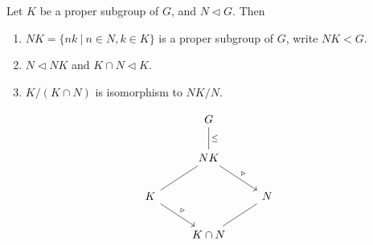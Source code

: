 \begin{theorem}
    Let $K$ be a proper subgroup of $G$, and $N \triangleleft G$. Then 
    \begin{enumerate}
        \item $NK = \{ nk \> | \> n\in N, k \in K \}$ is a proper subgroup of $G$, write $NK < G$.
        \item $N \triangleleft NK$ and $K \cap N \triangleleft K$.
        \item $K/(K \cap N)$ is isomorphism to $NK/N$.
    \end{enumerate}

    \[
        \begin{tikzcd}[row sep=2.0em]
            & G \arrow[dash, "\leq"]{d} & \\
            & NK \arrow[dash]{dl} \arrow[dr, "\triangleright"] & \\
            K \arrow[dr, "\triangleright"] & & N \arrow[dash]{dl} \\
            & K \cap N & \\
        \end{tikzcd}
    \]
\end{theorem}
